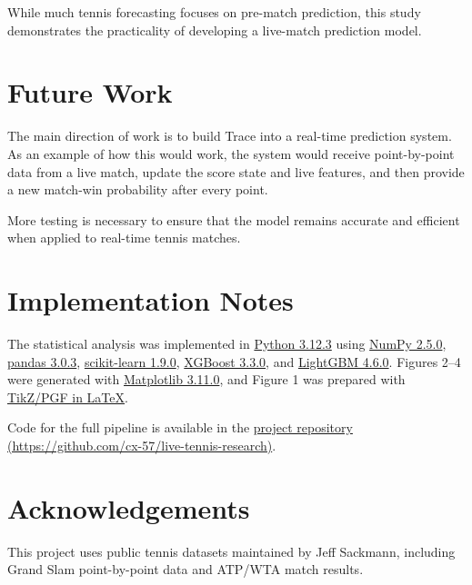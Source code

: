 \documentclass[10pt,twocolumn]{article}
\begin{document}
While much tennis forecasting focuses on pre-match prediction, this study demonstrates the practicality of developing a live-match prediction model.

\section{Future Work}

The main direction of work is to build Trace into a real-time prediction system. As an example of how this would work, the system would receive point-by-point data from a live match, update the score state and live features, and then provide a new match-win probability after every point.

More testing is necessary to ensure that the model remains accurate and efficient when applied to real-time tennis matches.

\section{Implementation Notes}

The statistical analysis was implemented in \href{https://www.python.org/}{Python 3.12.3} using \href{https://numpy.org/}{NumPy 2.5.0}, \href{https://pandas.pydata.org/}{pandas 3.0.3}, \href{https://scikit-learn.org/}{scikit-learn 1.9.0}, \href{https://xgboost.ai/}{XGBoost 3.3.0}, and \href{https://lightgbm.readthedocs.io/}{LightGBM 4.6.0}. Figures 2--4 were generated with \href{https://matplotlib.org/}{Matplotlib 3.11.0}, and Figure 1 was prepared with \href{https://ctan.org/pkg/pgf}{TikZ/PGF in LaTeX}.

Code for the full pipeline is available in the \href{https://github.com/cx-57/live-tennis-research}{project repository (https://github.com/cx-57/live-tennis-research)}.

\section{Acknowledgements}

This project uses public tennis datasets maintained by Jeff Sackmann, including Grand Slam point-by-point data and ATP/WTA match results.
\end{document}
